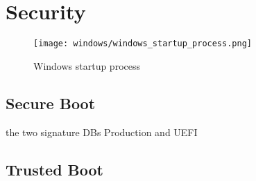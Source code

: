 
\section{Security}


\begin{figure}[htb]
    \centering
    \texttt{[image: windows/windows\_startup\_process.png]}
    \caption{Windows startup process\cite{microsoft-secure-the-windows-boot-process}}
    \label{fig:windows-startup-process}
\end{figure}

\subsection{Secure Boot}





\cite{microsoft-secure-the-windows-boot-process}

the two signature \acp{DB} Production and UEFI


\subsection{Trusted Boot}

